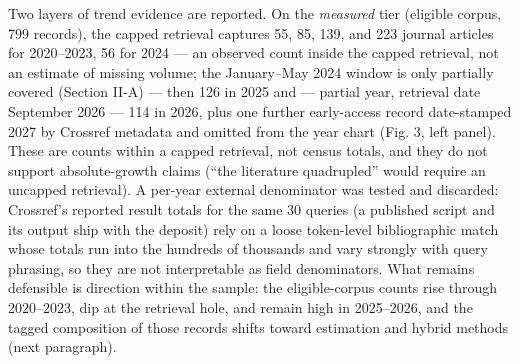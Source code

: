 \documentclass[journal]{IEEEtran}
\begin{document}
Two layers of trend evidence are reported. On the \textit{measured} tier (eligible corpus, 799 records), the capped retrieval captures 55, 85, 139, and 223 journal articles for 2020--2023, 56 for 2024 --- an observed count inside the capped retrieval, not an estimate of missing volume; the January--May 2024 window is only partially covered (Section II-A) --- then 126 in 2025 and --- partial year, retrieval date September 2026 --- 114 in 2026, plus one further early-access record date-stamped 2027 by Crossref metadata and omitted from the year chart (Fig. 3, left panel). These are counts within a capped retrieval, not census totals, and they do not support absolute-growth claims (``the literature quadrupled'' would require an uncapped retrieval). A per-year external denominator was tested and discarded: Crossref's reported result totals for the same 30 queries (a published script and its output ship with the deposit) rely on a loose token-level bibliographic match whose totals run into the hundreds of thousands and vary strongly with query phrasing, so they are not interpretable as field denominators. What remains defensible is direction within the sample: the eligible-corpus counts rise through 2020--2023, dip at the retrieval hole, and remain high in 2025--2026, and the tagged composition of those records shifts toward estimation and hybrid methods (next paragraph).
\end{document}
